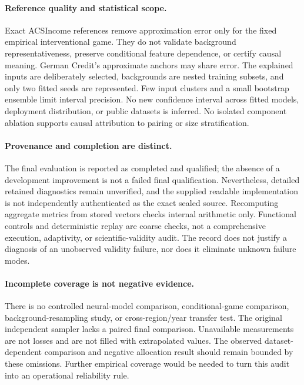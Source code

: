 \documentclass{article}
\begin{document}
\paragraph{Reference quality and statistical scope.}
Exact ACSIncome references remove approximation error only for the fixed empirical interventional game. They do not validate background representativeness, preserve conditional feature dependence, or certify causal meaning. German Credit's approximate anchors may share error. The explained inputs are deliberately selected, backgrounds are nested training subsets, and only two fitted seeds are represented. Few input clusters and a small bootstrap ensemble limit interval precision. No new confidence interval across fitted models, deployment distribution, or public datasets is inferred. No isolated component ablation supports causal attribution to pairing or size stratification.

\paragraph{Provenance and completion are distinct.}
The final evaluation is reported as completed and qualified; the absence of a development improvement is not a failed final qualification. Nevertheless, detailed retained diagnostics remain unverified, and the supplied readable implementation is not independently authenticated as the exact sealed source. Recomputing aggregate metrics from stored vectors checks internal arithmetic only. Functional controls and deterministic replay are coarse checks, not a comprehensive execution, adaptivity, or scientific-validity audit. The record does not justify a diagnosis of an unobserved validity failure, nor does it eliminate unknown failure modes.

\paragraph{Incomplete coverage is not negative evidence.}
There is no controlled neural-model comparison, conditional-game comparison, background-resampling study, or cross-region/year transfer test. The original independent sampler lacks a paired final comparison. Unavailable measurements are not losses and are not filled with extrapolated values. The observed dataset-dependent comparison and negative allocation result should remain bounded by these omissions. Further empirical coverage would be needed to turn this audit into an operational reliability rule.
\end{document}
